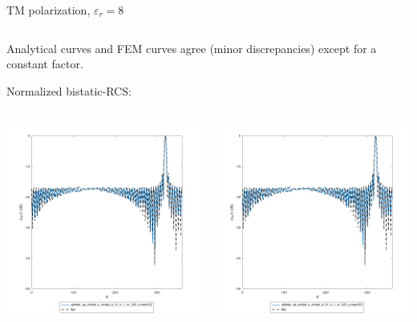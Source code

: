 \begin{frame}{TM polarization, $\varepsilon_r=8$}
\begin{columns}
\end{columns}

\vbs

Analytical curves and FEM curves agree (minor discrepancies) except for a constant factor. 

Normalized bistatic-RCS:

\vbss

\begin{columns}

\includegraphics[width=\linewidth]{results/FF/cylD_01_H_1_M_025_X/epr8_TM_norm.png}


\includegraphics[width=\linewidth]{results/FF/cylD_01_H_1_M_025_Y/epr8_TM_norm.png}


\end{columns}
\end{frame}
